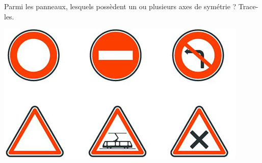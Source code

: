 \begin{pageAD}
 
 

 
 Parmi les panneaux, lesquels possèdent un ou plusieurs axes de symétrie ? Trace-les.
 
\begin{center}
 \includegraphics[scale=0.65]{FIG/panneaux3.jpg} 
 
\end{center}

\end{pageAD}



